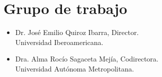 \section {Grupo de trabajo}
\begin{itemize}
	\item Dr. José Emilio Quiroz Ibarra, Director.\\
Universidad Iberoamericana.
	\item Dra. Alma Rocío Sagaceta Mejía, Codirectora.\\
Universidad Autónoma Metropolitana.
\end{itemize}